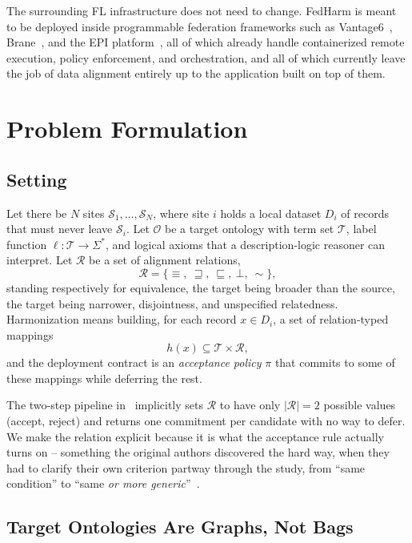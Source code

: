 \documentclass[conference]{IEEEtran}
\newcommand{\silo}{\mathcal{S}}
\newcommand{\onto}{\mathcal{O}}
\begin{document}
The surrounding FL infrastructure does not need to change. FedHarm is meant to be deployed inside programmable federation frameworks such as Vantage6~\cite{b34}, Brane~\cite{b33}, and the EPI platform~\cite{b35}, all of which already handle containerized remote execution, policy enforcement, and orchestration, and all of which currently leave the job of data alignment entirely up to the application built on top of them.

\section{Problem Formulation}
\label{sec:formulation}

\subsection{Setting}

Let there be $N$ sites $\silo_1,\dots,\silo_N$, where site $i$ holds a local dataset $D_i$ of records that must never leave $\silo_i$. Let $\onto$ be a target ontology with term set $\mathcal{T}$, label function $\ell : \mathcal{T} \to \Sigma^{*}$, and logical axioms that a description-logic reasoner can interpret. Let $\mathcal{R}$ be a set of alignment relations,
\begin{equation}
\mathcal{R} = \{\equiv,\ \sqsupseteq,\ \sqsubseteq,\ \bot,\ \sim\},
\end{equation}
standing respectively for equivalence, the target being broader than the source, the target being narrower, disjointness, and unspecified relatedness. Harmonization means building, for each record $x \in D_i$, a set of relation-typed mappings
\begin{equation}
h(x) \subseteq \mathcal{T} \times \mathcal{R},
\end{equation}
and the deployment contract is an \emph{acceptance policy} $\pi$ that commits to some of these mappings while deferring the rest.

The two-step pipeline in~\cite{b1} implicitly sets $\mathcal{R}$ to have only $|\mathcal{R}| = 2$ possible values (accept, reject) and returns one commitment per candidate with no way to defer. We make the relation explicit because it is what the acceptance rule actually turns on -- something the original authors discovered the hard way, when they had to clarify their own criterion partway through the study, from ``same condition'' to ``same \emph{or more generic}''~\cite{b1}.

\subsection{Target Ontologies Are Graphs, Not Bags}
\end{document}
